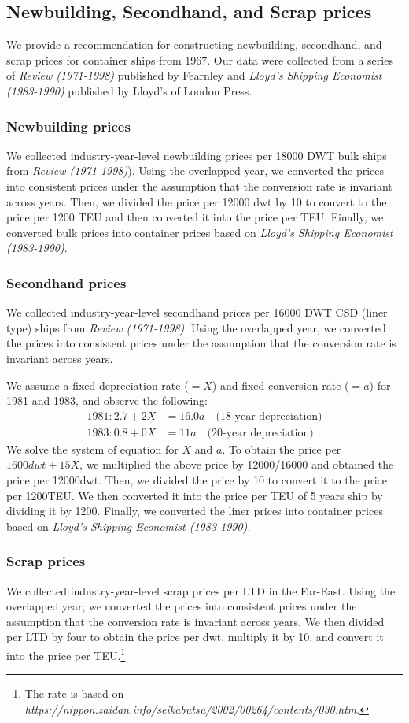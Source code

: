 \subsection{Newbuilding, Secondhand, and Scrap prices}
We provide a recommendation for constructing newbuilding, secondhand, and scrap prices for container ships from 1967. Our data were collected from a series of \textit{Review (1971-1998)} published by Fearnley and \textit{Lloyd's Shipping Economist (1983-1990)} published by Lloyd's of London Press. 

\subsubsection{Newbuilding prices}
We collected industry-year-level newbuilding prices per 18000 DWT bulk ships from \textit{Review (1971-1998)}). Using the overlapped year, we converted the prices into consistent prices under the assumption that the conversion rate is invariant across years. Then, we divided the price per 12000 dwt by 10 to convert to the price per 1200 TEU and then converted it into the price per TEU. Finally, we converted bulk prices into container prices based on \textit{Lloyd's Shipping Economist (1983-1990)}.

\subsubsection{Secondhand prices}
We collected industry-year-level secondhand prices per 16000 DWT CSD (liner type) ships from \textit{Review (1971-1998)}. Using the overlapped year, we converted the prices into consistent prices under the assumption that the conversion rate is invariant across years.

We assume a fixed depreciation rate ($= X$) and fixed conversion rate ($= a$) for 1981 and 1983, and observe the following:
\begin{align*}
    1981: 2.7 + 2X &= 16.0a \quad\text{(18-year depreciation)}\\
    1983: 0.8 + 0X &=11a \quad\text{(20-year depreciation)}
\end{align*}
We solve the system of equation for $X$ and $a$. To obtain the price per $1600dwt+15X$, we multiplied the above price by 12000/16000 and obtained the price per 12000dwt. Then, we divided the price by 10 to convert it to the price per 1200TEU. We then converted it into the price per TEU of 5 years ship by dividing it by 1200. Finally, we converted the liner prices into container prices based on \textit{Lloyd's Shipping Economist (1983-1990)}.


\subsubsection{Scrap prices}

We collected industry-year-level scrap prices per LTD in the Far-East. Using the overlapped year, we converted the prices into consistent prices under the assumption that the conversion rate is invariant across years. We then divided per LTD by four to obtain the price per dwt, multiply it by 10, and convert it into the price per TEU.\footnote{The rate is based on \textit{https://nippon.zaidan.info/seikabutsu/2002/00264/contents/030.htm}.}

